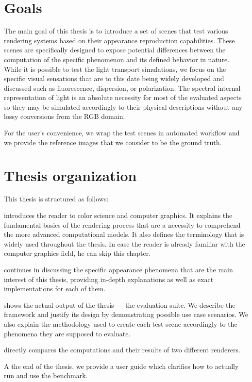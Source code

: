 \section*{Goals}

The main goal of this thesis is to introduce a set of scenes that test various rendering systems based on their appearance reproduction capabilities. These scenes are specifically designed to expose potential differences between the computation of the specific phenomenon and its defined behavior in nature. While it is possible to test the light transport simulations, we focus on the specific visual sensations that are to this date being widely developed and discussed such as fluorescence, dispersion, or polarization. The spectral internal representation of light is an absolute necessity for most of the evaluated aspects so they may be simulated accordingly to their physical descriptions without any lossy conversions from the RGB domain.

For the user's convenience, we wrap the test scenes in automated workflow and we provide the reference images that we consider to be the ground truth.

\section*{Thesis organization}

This thesis is structured as follows: 

 introduces the reader to color science and computer graphics. It explains the fundamental basics of the rendering process that are a necessity to comprehend the more advanced computational models. It also defines the terminology that is widely used throughout the thesis. In case the reader is already familiar with the computer graphics field, he can skip this chapter. 

 continues in discussing the specific appearance phenomena that are the main interest of this thesis, providing in-depth explanations as well as exact implementations for each of them. 

 shows the actual output of the thesis --- the evaluation suite. We describe the framework and justify its design by demonstrating possible use case scenarios. We also explain the methodology used to create each test scene accordingly to the phenomena they are supposed to evaluate.

 directly compares the computations and their results of two different renderers.

A the end of the thesis, we provide a user guide which clarifies how to actually run and use the benchmark.

